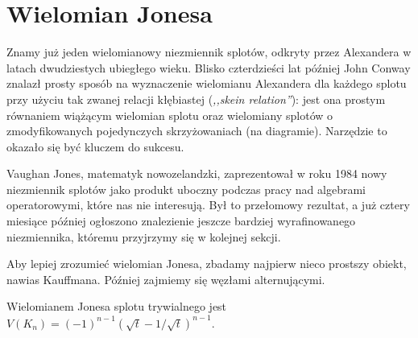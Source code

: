 \section{Wielomian Jonesa} %
\label{sec:jones}

Znamy już jeden wielomianowy niezmiennik splotów, odkryty przez Alexandera w latach dwudziestych ubiegłego wieku.
Blisko czterdzieści lat później John Conway znalazł prosty sposób na wyznaczenie wielomianu
Alexandera dla każdego splotu przy użyciu tak zwanej relacji kłębiastej (\emph{,,skein relation''}):
jest ona prostym równaniem wiążącym wielomian splotu oraz wielomiany
splotów o zmodyfikowanych pojedynczych skrzyżowaniach (na diagramie).
Narzędzie to okazało się być kluczem do sukcesu.

Vaughan Jones, matematyk nowozelandzki, zaprezentował w roku 1984 nowy niezmiennik splotów
jako produkt uboczny podczas pracy nad algebrami operatorowymi, które nas nie interesują.
Był to przełomowy rezultat, a już cztery miesiące później ogłoszono znalezienie
jeszcze bardziej wyrafinowanego niezmiennika, któremu przyjrzymy się w kolejnej sekcji.

Aby lepiej zrozumieć wielomian Jonesa, zbadamy najpierw nieco prostszy obiekt, nawias Kauffmana.
Później zajmiemy się węzłami alternującymi.















\begin{proposition}
\label{prp:jones_trivial_link}
	Wielomianem Jonesa splotu trywialnego jest $V(K_n) = (-1)^{n-1} (\sqrt{t} - 1/\sqrt{t})^{n-1}$.
\end{proposition}

